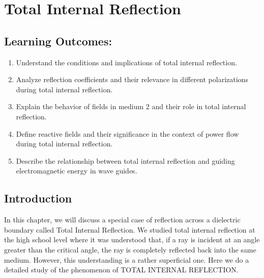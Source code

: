 \chapter{Total Internal Reflection}\label{lec:lec32}

\section{Learning Outcomes:}
\begin{mdframed}[backgroundcolor=lightblue, linewidth=1pt, hidealllines=true]
    \begin{enumerate}[label=\roman*., itemsep=0pt, topsep=0pt]
        \item Understand the conditions and implications of total internal reflection.
        \item Analyze reflection coefficients and their relevance in different polarizations during total internal reflection.
        \item Explain the behavior of fields in medium 2 and their role in total internal reflection.
        \item Define reactive fields and their significance in the context of power flow during total internal reflection.
        \item Describe the relationship between total internal reflection and guiding electromagnetic energy in wave guides.
    \end{enumerate}
\end{mdframed}

\section{Introduction}

In this chapter, we will discuss a special case of reflection across a dielectric boundary called Total Internal Reflection. We studied total internal reflection at the high school level where it was understood that, if a ray is incident at an angle greater than the critical angle, the ray is completely reflected back into the same medium. However, this understanding is a rather superficial one. Here we do a detailed study of the phenomenon of TOTAL INTERNAL REFLECTION.

